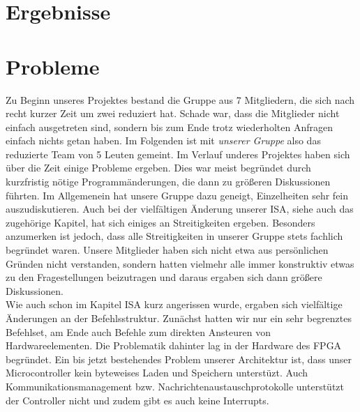 
\section{Ergebnisse}

\section{Probleme}
Zu Beginn unseres Projektes bestand die Gruppe aus 7 Mitgliedern, die sich nach recht kurzer Zeit um zwei reduziert hat. Schade war, dass die Mitglieder nicht einfach ausgetreten sind, sondern bis zum Ende trotz wiederholten Anfragen einfach nichts getan haben. Im Folgenden ist mit \textit{unserer Gruppe} also das reduzierte Team von 5 Leuten gemeint.
Im Verlauf underes Projektes haben sich über die Zeit einige Probleme ergeben. Dies war meist begründet durch kurzfristig nötige Programmänderungen, die dann zu größeren Diskussionen führten. Im Allgemenein hat unsere Gruppe dazu geneigt, Einzelheiten sehr fein auszudiskutieren. Auch bei der vielfältigen Änderung unserer ISA, siehe auch das zugehörige Kapitel, hat sich einiges an Streitigkeiten ergeben. Besonders anzumerken ist jedoch, dass alle Streitigkeiten in unserer Gruppe stets fachlich begründet waren. Unsere Mitglieder haben sich nicht etwa aus persönlichen Gründen nicht verstanden, sondern hatten vielmehr alle immer konstruktiv etwas zu den Fragestellungen beizutragen und daraus ergaben sich dann größere Diskussionen.\\[1em]
%
Wie auch schon im Kapitel ISA kurz angerissen wurde, ergaben sich vielfältige Änderungen an der Befehlsstruktur. Zunächst hatten wir nur ein sehr begrenztes Befehlset, am Ende auch Befehle zum direkten Ansteuren von Hardwareelementen. Die Problematik dahinter lag in der Hardware des FPGA begründet. 
Ein bis jetzt bestehendes Problem unserer Architektur ist, dass unser Microcontroller kein byteweises Laden und Speichern unterstüzt. Auch Kommunikationsmanagement bzw. Nachrichtenaustauschprotokolle unterstützt der Controller nicht und zudem gibt es auch keine Interrupts.

